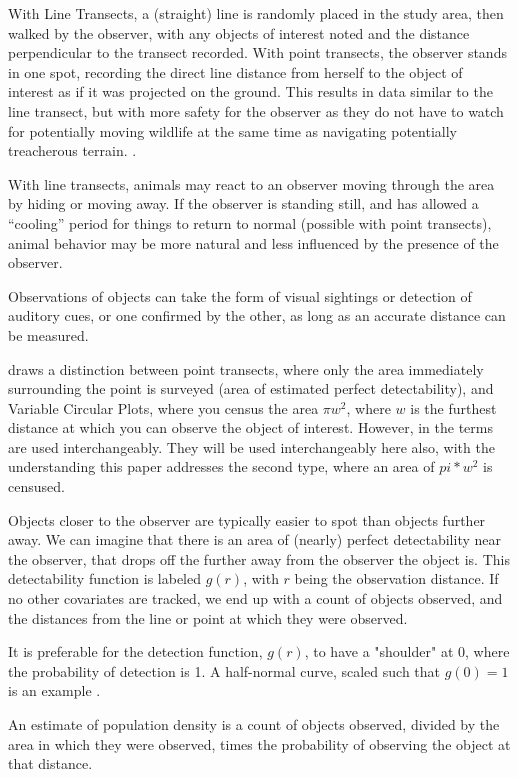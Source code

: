 \documentclass[12pt]{article}
\begin{document}
With Line Transects, a (straight) line is randomly placed in the study area, then walked by the observer, with any objects of interest noted and the distance perpendicular to the transect recorded. With point transects, the observer stands in one spot, recording the direct line distance from herself to the object of interest as if it was projected on the ground. This results in data similar to the line transect, but with more safety for the observer as they do not have to watch for potentially moving wildlife at the same time as navigating potentially treacherous terrain. \cite{ramsey1979}.

With line transects, animals may react to an observer moving through the area by hiding or moving away. If the observer is standing still, and has allowed a ``cooling'' period for things to return to normal (possible with point transects), animal behavior may be more natural and less influenced by the presence of the observer.

Observations of objects can take the form of visual sightings or detection of auditory cues, or one confirmed by the other, as long as an accurate distance can be measured.

\textcite[6]{buckland2001} draws a distinction between point transects, where only the area immediately surrounding the point is surveyed (area of estimated perfect detectability), and Variable Circular Plots, where you census the area $\pi w^2$, where $w$ is the furthest distance at which you can observe the object of interest. However, in \textcite{buckland2006, quang1993} the terms are used interchangeably. They will be used interchangeably here also, with the understanding this paper addresses the second type, where an area of $pi*w^2$ is censused.

Objects closer to the observer are typically easier to spot than objects further away. We can imagine that there is an area of (nearly) perfect detectability near the observer, that drops off the further away from the observer the object is. This detectability function is labeled $g(r)$, with $r$ being the observation distance. If no other covariates are tracked, we end up with a count of objects observed, and the distances from the line or point at which they were observed.

It is preferable for the detection function, $g(r)$, to have a "shoulder" at 0, where the probability of detection is 1. A half-normal curve, scaled such that $g(0)=1$ is an example \parencite{buckland2001}.

An estimate of population density is a count of objects observed, divided by the area in which they were observed, times the probability of observing the object at that distance.
\end{document}

